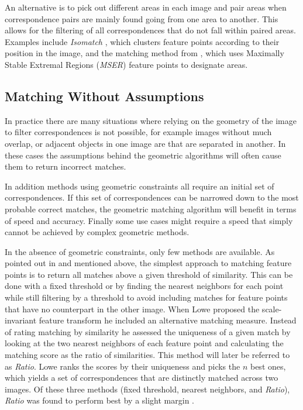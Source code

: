 An alternative is to pick out different areas in each image and pair 
areas when correspondence pairs are mainly found going from one area to 
another. This allows for the filtering of all correspondences that do 
not fall within paired areas. Examples include \emph{Isomatch} 
\cite{das2008event}, which clusters feature points according to their 
position in the image, and the matching method from \cite{wu2011robust}, 
which uses Maximally Stable Extremal Regions (\emph{MSER}) feature 
points to designate areas. 

\subsection{Matching Without Assumptions}

In practice there are many situations where relying on the geometry of 
the image to filter correspondences is not possible, for example images 
without much overlap, or adjacent objects in one image are that are 
separated in another. In these cases the assumptions behind the 
geometric algorithms will often cause them to return incorrect matches.  

In addition methods using geometric constraints all require an initial 
set of correspondences. If this set of correspondences can be narrowed 
down to the most probable correct matches, the geometric matching 
algorithm will benefit in terms of speed and accuracy.  Finally some use 
cases might require a speed that simply cannot be achieved by complex 
geometric methods.

In the absence of geometric constraints, only few methods are available.  
As pointed out in \cite{szeliski2010} and mentioned above, the simplest 
approach to matching feature points is to return all matches above a 
given threshold of similarity.  This can be done with a fixed threshold 
or by finding the nearest neighbors for each point while still filtering 
by a threshold to avoid including matches for feature points that have 
no counterpart in the other image.  When Lowe \cite{lowe2004sift} 
proposed the scale-invariant feature transform he included an 
alternative matching measure. Instead of rating matching by similarity 
he assessed the uniqueness of a given match by looking at the two 
nearest neighbors of each feature point and calculating the matching 
score as the ratio of similarities. This method will later be referred 
to as \emph{Ratio}.  Lowe ranks the scores by their uniqueness and picks 
the $n$ best ones, which yields a set of correspondences that are 
distinctly matched across two images.  Of these three methods (fixed 
threshold, nearest neighbors, and \emph{Ratio}), \emph{Ratio} was found 
to perform best by a slight margin \cite{mikolajczyk2005performance}.

